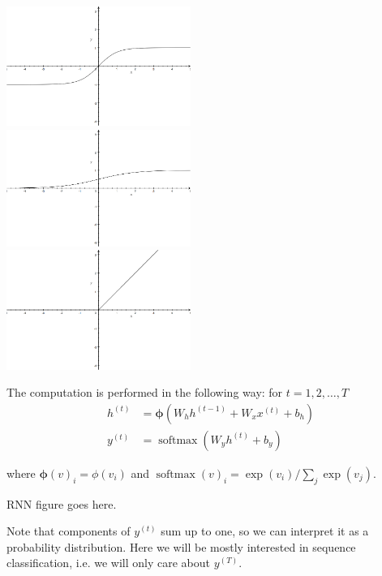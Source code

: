 \documentclass[titlepage]{report}
\DeclareMathOperator{\softmax}{softmax}
\begin{document}
\begin{center}
\includegraphics[width=60mm]{tanh} \\
\includegraphics[width=60mm]{sigma} \\
\includegraphics[width=60mm]{relu}
\end{center}

\noindent
The computation is performed in the following way: for $t = 1, 2, \ldots, T$
\begin{align*}
h^{(t)} &= \boldsymbol{\phi} \left( W_h h^{(t - 1)} + W_x x^{(t)} + b_h \right) \\
y^{(t)} &= \softmax \left( W_y h^{(t)} + b_y \right)
\end{align*}

\noindent
where $\boldsymbol{\phi}(v)_i = \phi(v_i)$ and $\softmax(v)_i = \exp(v_i) / \sum_j \exp(v_j)$. 

\begin{center}
RNN figure goes here.
\end{center}

\noindent
Note that components of $y^{(t)}$ sum up to one, so we can interpret it as a probability distribution. Here we will be mostly interested in sequence classification, i.e. we will only care about $y^{(T)}$.
\end{document}
